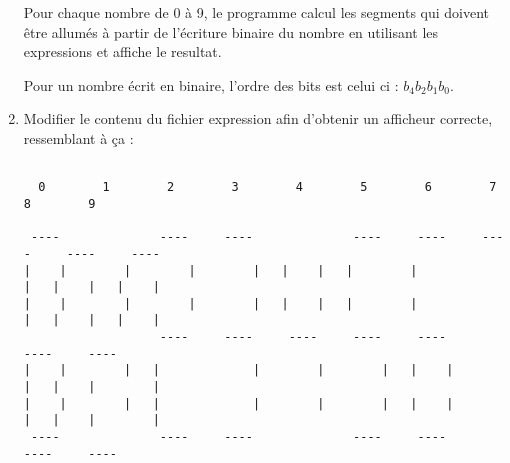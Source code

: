 \documentclass[11pt]{article}
\newcommand{\Mmae}[1]{{\ttfamily #1}}
\begin{document}
\begin{enumerate}
      Pour chaque nombre de 0 à 9, le programme calcul les segments qui 
      doivent être allumés à partir de l'écriture binaire du nombre
      en utilisant les expressions et affiche le resultat. 
      \par
      Pour un nombre écrit en binaire, l'ordre des bits est celui ci : $b_4b_2b_1b_0$.

   \item Modifier le contenu du fichier \Mmae{expression} afin d'obtenir un 
      afficheur correcte, ressemblant à ça :
      \begin{verbatim}
                                                                                             
  0        1        2        3        4        5        6        7        8        9         
                                                                                             
 ----              ----     ----              ----     ----     ----     ----     ----       
|    |        |        |        |   |    |   |        |             |   |    |   |    |      
|    |        |        |        |   |    |   |        |             |   |    |   |    |      
                   ----     ----     ----     ----     ----              ----     ----       
|    |        |   |             |        |        |   |    |        |   |    |        |      
|    |        |   |             |        |        |   |    |        |   |    |        |      
 ----              ----     ----              ----     ----              ----     ----       
                                                                     
      \end{verbatim}

\end{enumerate}
\end{document}

